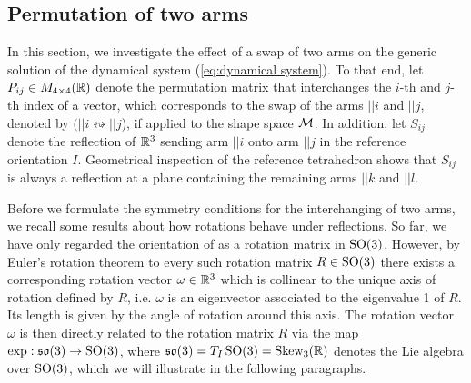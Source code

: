\subsection{Permutation of two arms}
In this section, we investigate the effect of a swap of two arms on the generic solution of the dynamical system (\ref{eq:dynamical system}).
To that end, let $P_{ij} \in M_{4 \times 4}(\mathbb{R})$ denote the permutation matrix that interchanges the $i$-th and $j$-th index of a vector, which corresponds to the swap of the arms $||i$ and $||j$, denoted by $(||i\leftrightsquigarrow ||j$), if applied to the shape space $\mathcal{M}$. In addition, let $S_{ij}$ denote the reflection of $\mathbb{R}^3$ sending arm $||i$ onto arm $||j$ in the reference orientation $I$. Geometrical inspection of the reference tetrahedron shows that $S_{ij}$ is always a reflection at a plane containing the remaining arms $||k$ and $||l$.

Before we formulate the symmetry conditions for the interchanging of two arms, we recall some results about how rotations behave under reflections. So far, we have only regarded the orientation of \spr as a rotation matrix in $\operatorname{SO}(3)$. However, by Euler's rotation theorem to every such rotation matrix $R \in \operatorname{SO}(3)$ there exists a corresponding rotation vector $\omega \in \mathbb{R}^3$ which is collinear to the unique axis of rotation defined by $R$, i.e. $\omega$ is an eigenvector associated to the eigenvalue 1 of $R$. Its length is given by the angle of rotation around this axis. The rotation vector $\omega$ is then directly related to the rotation matrix $R$ via the map $\exp: \mathfrak{so}(3) \to \operatorname{SO}(3)$, where $\mathfrak{so}(3) = T_I \operatorname{SO}(3) = \operatorname{Skew}_3(\mathbb{R})$ denotes the Lie algebra over $\operatorname{SO}(3)$, which we will illustrate in the following paragraphs.


